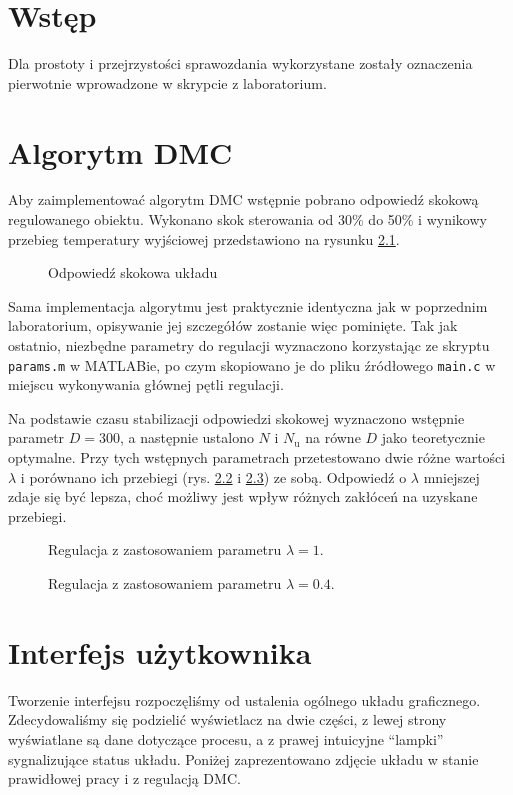 \chapter{Wstęp}
Dla prostoty i przejrzystości sprawozdania wykorzystane zostały oznaczenia pierwotnie wprowadzone w skrypcie z laboratorium\@.

\chapter{Algorytm DMC}

Aby zaimplementować algorytm DMC wstępnie pobrano odpowiedź skokową regulowanego obiektu. Wykonano skok sterowania od 30\% do 50\% i wynikowy przebieg temperatury wyjściowej przedstawiono na rysunku \ref{step}.

\begin{figure}[H]
	\centering
	
	\caption{Odpowiedź skokowa układu}
	\label{step}
\end{figure}

Sama implementacja algorytmu jest praktycznie identyczna jak w poprzednim laboratorium, opisywanie jej szczegółów zostanie więc pominięte. Tak jak ostatnio, niezbędne parametry do regulacji wyznaczono korzystając ze skryptu \verb|params.m| w MATLABie, po czym skopiowano je do pliku źródłowego \verb|main.c| w miejscu wykonywania głównej pętli regulacji.

Na podstawie czasu stabilizacji odpowiedzi skokowej wyznaczono wstępnie parametr $ D = 300 $, a następnie ustalono $ N $ i $ N_\mathrm{u} $ na równe $ D $ jako teoretycznie optymalne. Przy tych wstępnych parametrach przetestowano dwie różne wartości $ \lambda $ i porównano ich przebiegi (rys. \ref{DMC1} i \ref{DMC2}) ze sobą. Odpowiedź o $ \lambda $ mniejszej zdaje się być lepsza, choć możliwy jest wpływ różnych zakłóceń na uzyskane przebiegi.


\begin{figure}[ht]
\centering

\caption{Regulacja z zastosowaniem parametru $ \lambda=1 $.}
\label{DMC1}
\end{figure}

\begin{figure}[H]
\centering

\caption{Regulacja z zastosowaniem parametru $ \lambda=\num{0,4} $.}
\label{DMC2}
\end{figure}


\chapter{Interfejs użytkownika}
Tworzenie interfejsu rozpoczęliśmy od ustalenia ogólnego układu graficznego. Zdecydowaliśmy się podzielić wyświetlacz na dwie części, z lewej strony wyświatlane są dane dotyczące procesu, a z prawej intuicyjne ``lampki'' sygnalizujące status układu. Poniżej zaprezentowano zdjęcie układu w stanie prawidłowej pracy i z regulacją DMC.


